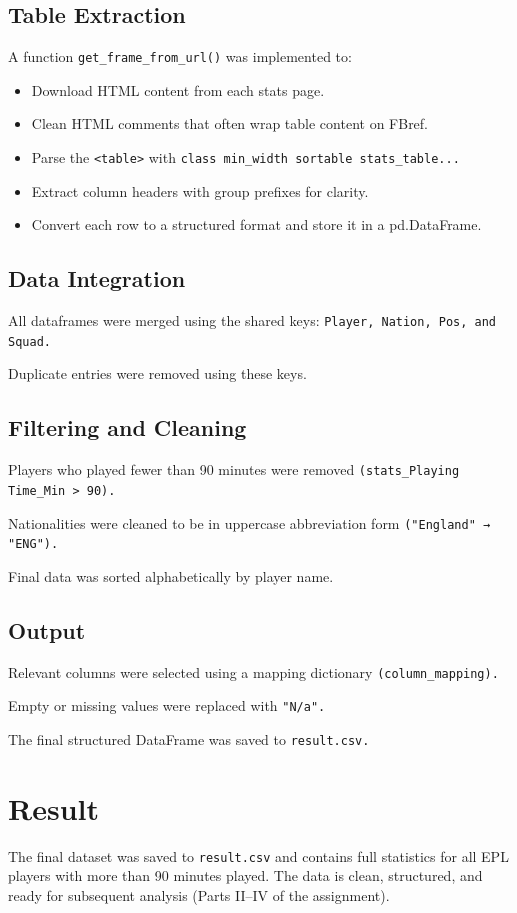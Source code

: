\documentclass[12pt,a4paper]{report}
\begin{document}
\subsection{Table Extraction}
A function \texttt{get\_frame\_from\_url()} was implemented to:
\begin{itemize}
    \item Download HTML content from each stats page.
    \item Clean HTML comments that often wrap table content on FBref.
    \item Parse the \texttt{<table>} with \texttt{class min\_width sortable stats\_table...}
    \item Extract column headers with group prefixes for clarity.
    \item Convert each row to a structured format and store it in a pd.DataFrame.
\end{itemize}

\subsection{Data Integration}
All dataframes were merged using the shared keys: \texttt{Player, Nation, Pos, and Squad.} 

Duplicate entries were removed using these keys.

\subsection{Filtering and Cleaning}
   Players who played fewer than 90 minutes were removed \texttt{(stats\_Playing Time\_Min > 90).}
   
   Nationalities were cleaned to be in uppercase abbreviation form \texttt{("England" → "ENG").}
   
   Final data was sorted alphabetically by player name.

\subsection{Output}
   Relevant columns were selected using a mapping dictionary \texttt{(column\_mapping).}
   
   Empty or missing values were replaced with \texttt{"N/a".}
   
   The final structured DataFrame was saved to \texttt{result.csv.}

\section{Result}
The final dataset was saved to \texttt{result.csv} and contains full statistics for all EPL players with more than 90 minutes played. The data is clean, structured, and ready for subsequent analysis (Parts II--IV of the assignment).
\end{document}
